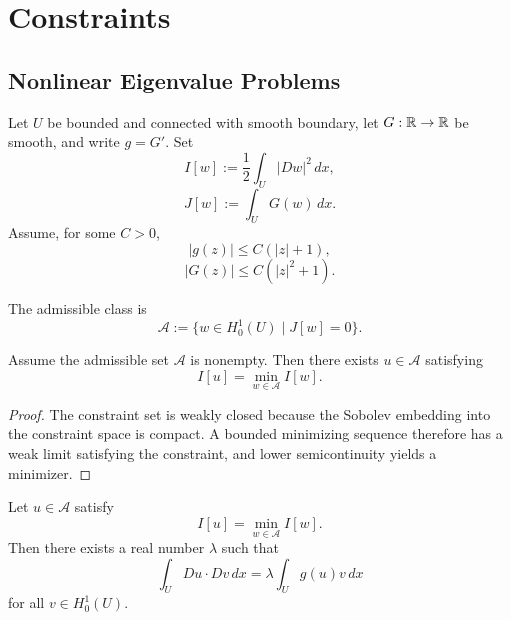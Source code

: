 \section{Constraints}
\label{sec:constraints-calculus-of-variations}

\subsection{Nonlinear Eigenvalue Problems}
\label{sec:nonlinear-eigenvalue-problems}

Let $U$ be bounded and connected with smooth boundary, let $G:\mathbb{R}\to\mathbb{R}$ be smooth, and write $g=G'$. Set
\[
I[w]:=\frac12\int_U|Dw|^2\,dx,
\tag{1}
\]
\[
J[w]:=\int_UG(w)\,dx.
\tag{2}
\]
Assume, for some $C>0$,
\[
|g(z)|\leq C(|z|+1),
\tag{3}
\]
\[
|G(z)|\leq C(|z|^2+1).
\tag{4}
\]

\begin{definition}
\label{def:admissible-class-nonlinear-eigenvalue}
The admissible class is
\[
\mathcal{A} := \{w \in H_0^1(U) \mid J[w] = 0\}.
\]
\end{definition}

\begin{theorem}
\label{thm:existence-constrained-minimizer-nonlinear-eigenvalue}

Assume the admissible set $\mathcal{A}$ is nonempty. Then there exists $u \in \mathcal{A}$ satisfying
\[
I[u] = \min_{w \in \mathcal{A}} I[w].
\]
\end{theorem}

\begin{proof}
\sketch The constraint set is weakly closed because the Sobolev embedding into the constraint space is compact. A bounded minimizing sequence therefore has a weak limit satisfying the constraint, and lower semicontinuity yields a minimizer.
\end{proof}

\begin{theorem}
\label{thm:lagrange-multiplier-nonlinear-eigenvalue}

Let $u \in \mathcal{A}$ satisfy
\[
I[u] = \min_{w \in \mathcal{A}} I[w].
\tag{9}
\]
Then there exists a real number $\lambda$ such that
\[
\int_U Du \cdot Dv\, dx = \lambda \int_U g(u)v\, dx
\tag{10}
\]
for all $v \in H_0^1(U)$.
\end{theorem}

